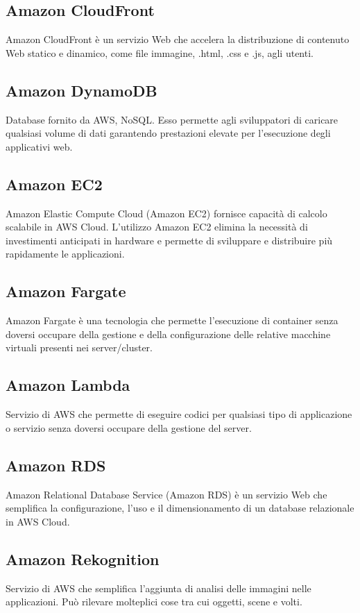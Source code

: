 \documentclass{classes/base}
\begin{document}
        \subsection*{Amazon CloudFront}
        Amazon CloudFront è un servizio Web che accelera la distribuzione di contenuto Web statico e dinamico, come file immagine, .html, .css e .js, agli utenti.

        \subsection*{Amazon DynamoDB}
        Database fornito da AWS, NoSQL. Esso permette agli sviluppatori di caricare qualsiasi volume di dati garantendo prestazioni elevate per l'esecuzione degli applicativi web.

        \subsection*{Amazon EC2}
        Amazon Elastic Compute Cloud (Amazon EC2) fornisce capacità di calcolo scalabile in AWS Cloud. L'utilizzo Amazon EC2 elimina la necessità di investimenti anticipati in hardware e permette di sviluppare e distribuire più rapidamente le applicazioni.

        \subsection*{Amazon Fargate}
        Amazon Fargate è una tecnologia che permette l'esecuzione di container senza doversi occupare della gestione e della configurazione delle relative macchine virtuali presenti nei server/cluster. 

        \subsection*{Amazon Lambda}
        Servizio di AWS che permette di eseguire codici per qualsiasi tipo di applicazione o servizio senza doversi occupare della gestione del server.

        \subsection*{Amazon RDS}
        Amazon Relational Database Service (Amazon RDS) è un servizio Web che semplifica la configurazione, l'uso e il dimensionamento di un database relazionale in AWS Cloud.

        \subsection*{Amazon Rekognition}
        Servizio di AWS che semplifica l'aggiunta di analisi delle immagini nelle applicazioni. Può rilevare molteplici cose tra cui oggetti, scene e volti.
\end{document}
